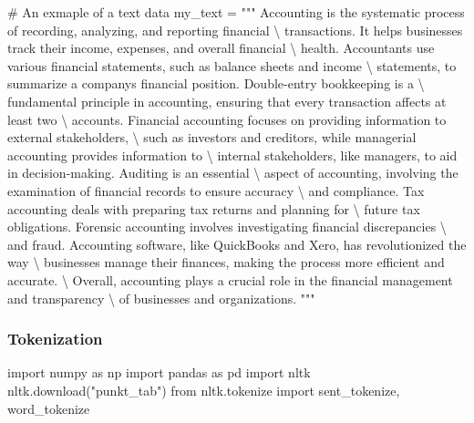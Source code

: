 \documentclass[
  letterpaper,
  DIV=11,
  numbers=noendperiod]{scrreprt}
\newenvironment{Shaded}{\begin{snugshade}}{\end{snugshade}}
\newcommand{\CommentTok}[1]{\textcolor[rgb]{0.37,0.37,0.37}{#1}}
\newcommand{\ImportTok}[1]{\textcolor[rgb]{0.00,0.46,0.62}{#1}}
\newcommand{\NormalTok}[1]{\textcolor[rgb]{0.00,0.23,0.31}{#1}}
\newcommand{\OperatorTok}[1]{\textcolor[rgb]{0.37,0.37,0.37}{#1}}
\newcommand{\StringTok}[1]{\textcolor[rgb]{0.13,0.47,0.30}{#1}}
\begin{document}
\begin{Shaded}
\begin{Highlighting}[]
\CommentTok{\# An exmaple of a text data }
\NormalTok{my\_text }\OperatorTok{=} \StringTok{"""}
\StringTok{Accounting is the systematic process of recording, analyzing, and reporting financial }\OperatorTok{\textbackslash{}}
\StringTok{transactions. It helps businesses track their income, expenses, and overall financial }\OperatorTok{\textbackslash{}}
\StringTok{health. Accountants use various financial statements, such as balance sheets and income }\OperatorTok{\textbackslash{}}
\StringTok{statements, to summarize a company\textquotesingle{}s financial position. Double{-}entry bookkeeping is a }\OperatorTok{\textbackslash{}}
\StringTok{fundamental principle in accounting, ensuring that every transaction affects at least two }\OperatorTok{\textbackslash{}}
\StringTok{accounts. Financial accounting focuses on providing information to external stakeholders, }\OperatorTok{\textbackslash{}}
\StringTok{such as investors and creditors, while managerial accounting provides information to }\OperatorTok{\textbackslash{}}
\StringTok{internal stakeholders, like managers, to aid in decision{-}making. Auditing is an essential }\OperatorTok{\textbackslash{}}
\StringTok{aspect of accounting, involving the examination of financial records to ensure accuracy }\OperatorTok{\textbackslash{}}
\StringTok{and compliance. Tax accounting deals with preparing tax returns and planning for }\OperatorTok{\textbackslash{}}
\StringTok{future tax obligations. Forensic accounting involves investigating financial discrepancies }\OperatorTok{\textbackslash{}}
\StringTok{and fraud. Accounting software, like QuickBooks and Xero, has revolutionized the way }\OperatorTok{\textbackslash{}}
\StringTok{businesses manage their finances, making the process more efficient and accurate. }\OperatorTok{\textbackslash{}}
\StringTok{Overall, accounting plays a crucial role in the financial management and transparency }\OperatorTok{\textbackslash{}}
\StringTok{of businesses and organizations.}
\StringTok{"""}
\end{Highlighting}
\end{Shaded}

\subsubsection{Tokenization}\label{tokenization}

\begin{Shaded}
\begin{Highlighting}[]
\ImportTok{import}\NormalTok{ numpy }\ImportTok{as}\NormalTok{ np}
\ImportTok{import}\NormalTok{ pandas }\ImportTok{as}\NormalTok{ pd}
\ImportTok{import}\NormalTok{ nltk}
\NormalTok{nltk.download(}\StringTok{"punkt\_tab"}\NormalTok{)}
\ImportTok{from}\NormalTok{ nltk.tokenize }\ImportTok{import}\NormalTok{ sent\_tokenize, word\_tokenize}
\end{Highlighting}
\end{Shaded}
\end{document}
